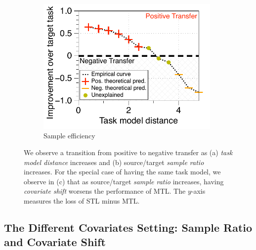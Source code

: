 \begin{figure}[!t]
\begin{subfigure}[b]{0.32\textwidth}
		\includegraphics[width=0.98\textwidth]{figures/model_shift_phase_transition.pdf}
		\caption{Sample efficiency}
		\label{fig_model_shift}
	\end{subfigure}
	\caption{%
	We observe a transition from positive to negative transfer as (a) \textit{task model distance} increases and (b) source/target \textit{sample ratio} increases.
	For the special case of having the same task model, we observe in (c) that as source/target \textit{sample ratio} increases, having \textit{covariate shift} worsens the performance of MTL.
	The $y$-axis measures the loss of STL minus MTL.}
	\label{fig_model_shift_phasetrans}
\end{figure}


\subsection{The Different Covariates Setting: Sample Ratio and Covariate Shift}\label{sec_exp_sample}


